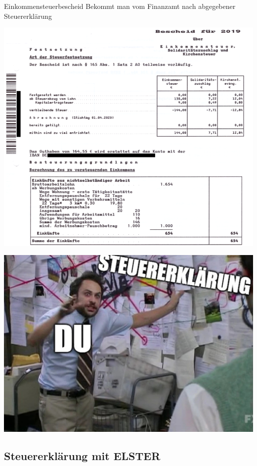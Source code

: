 \documentclass{beamer}
\begin{document}
			\begin{frame}{Einkommensteuerbescheid}{}
				{\tiny Bekommt man vom Finanzamt nach abgegebener Steuererklärung}
				\begin{center}
					\includegraphics[width=0.55\linewidth]{images/einkommensteuerbescheid_2019}
				\end{center}
			\end{frame}
			
			\begin{frame}
				\begin{center}
					\includegraphics[height=0.9\textheight]{images/meme-tax-insane.jpg}
				\end{center}
			\end{frame}
		
		\subsection{Steuererklärung mit ELSTER}
		
\end{document}
